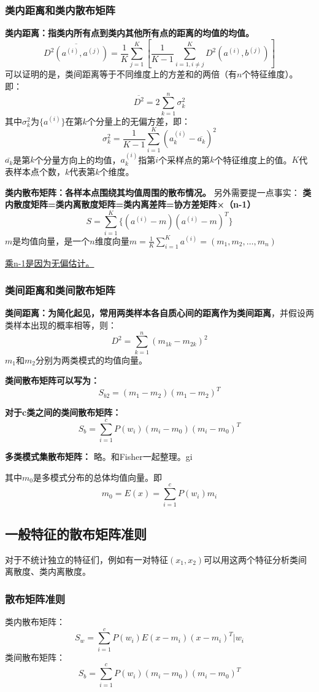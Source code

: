 \documentclass[12pt, letterpaper]{article}
\begin{document}
\subsubsection*{类内距离和类内散布矩阵}
\textbf{类内距离：指类内所有点到类内其他所有点的距离的均值的均值。}
$$
\overline{D^2(a^{(i)},a^{(j)})}=\frac{1}{K}\sum_{j=1}^{K}\left[\frac{1}{K-1}\sum_{i=1,i\neq j}^{K}D^2(a^{(i)},b^{(j)})\right]
$$
可以证明的是，类间距离等于不同维度上的方差和的两倍（有$n$个特征维度）。即：
$$
\overline{D^2}=2\sum_{k=1}^n\sigma_k^2
$$
其中$\sigma_k^2$为$\{a^{(i)}\}$在第$k$个分量上的无偏方差，即：
$$
\sigma_k^2=\frac{1}{K-1}\sum_{i=1}^K(a_k^{(i)}-\overline{a_k})^2
$$
{$\bar{a_k}$}是第$k$个分量方向上的均值，$a_k^{(i)}$指第$i$个采样点的第$k$个特征维度上的值。$K$代表样本点个数，$k$代表第$k$个维度。


\textbf{类内散布矩阵：各样本点围绕其均值周围的散布情况。}
另外需要提一点事实：\textbf{
类内散度矩阵=类内离散度矩阵=类内离差阵=协方差矩阵×（n-1）}
$$
S=\sum_{i=1}^K\{(a^{(i)}-m)(a^{(i)}-m)^T\}
$$
$m$是均值向量，是一个$n$维度向量$m=\frac{1}{K}\sum_{i=1}^Ka^{(i)}=(m_1,m_2,\ldots,m_n)$

\href{https://blog.csdn.net/Hearthougan/article/details/77859173}{乘n-1是因为无偏估计。}

\subsubsection*{类间距离和类间散布矩阵}
\textbf{类间距离：为简化起见，常用两类样本各自质心间的距离作为类间距离}，并假设两类样本出现的概率相等，则：
$$
D^2=\sum_{k=1}^n(m_{1k}-m_{2k})^2
$$
$m_1$和$m_2$分别为两类模式的均值向量。

\textbf{类间散布矩阵可以写为：}
$$
S_{b2}=(m_1-m_2)(m_1-m_2)^T
$$

\textbf{对于c类之间的类间散布矩阵：}
$$
S_{b}=\sum_{i=1}^cP(w_i)(m_i-m_0)(m_i-m_0)^T
$$

\textbf{多类模式集散布矩阵：}
略。和Fisher一起整理。gi

其中$m_0$是多模式分布的总体均值向量。即
$$
m_0=E(x)=\sum_{i=1}^cP(w_i)m_i
$$




\subsection{一般特征的散布矩阵准则}
对于不统计独立的特征们，例如有一对特征$(x_1,x_2)$可以用这两个特征分析类间离散度、类内离散度。
\subsubsection*{散布矩阵准则}
类内散布矩阵：
$$
S_w=\sum_{i=1}^{c}P(w_i)E{(x-m_i)(x-m_i)^T|w_i}
$$
类间散布矩阵：
\begin{equation}
S_b=\sum_{i=1}^cP(w_i)(m_i-m_0)(m_i-m_0)^T
\end{equation}
\end{document}
